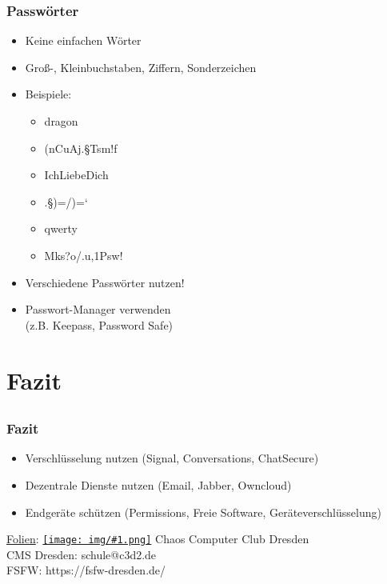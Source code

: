 \documentclass[12pt, xcolor={svgnames,table}]{beamer}
\newcommand{\cc}[1]{\texttt{[image: img/\#1.png]}\hspace{1mm}}
\begin{document}
\begin{frame}
    \frametitle{Passwörter}
    \begin{itemize}
        \item<2-> Keine einfachen Wörter
        \item<3-> Groß-, Kleinbuchstaben, Ziffern, Sonderzeichen
        \item<4-> Beispiele:
            \begin{itemize}
                \item<5-> dragon
                \item<6-> (nCuAj.§Tsm!f
                \item<7-> IchLiebeDich
                \item<8-> .§)=/)=`
                \item<9-> qwerty
                \item<10-> Mks?o/.u,1Psw!
            \end{itemize}
        \item<12-> Verschiedene Passwörter nutzen!
        \item<13-> Passwort-Manager verwenden \\ (z.B. Keepass, Password Safe)
    \end{itemize}
\end{frame}

\section{Fazit}
\subsection{}

\begin{frame}
  \frametitle{Fazit}
  \begin{center}
    \begin{itemize}
      \item Verschlüsselung nutzen (Signal, Conversations, ChatSecure)
      \item Dezentrale Dienste nutzen (Email, Jabber, Owncloud)
      \item Endgeräte schützen (Permissions, Freie Software, Geräteverschlüsselung)
    \end{itemize}

    \vspace{5mm}
    \href{https://github.com/c3d2/cms-nsa}{Folien}: \href{https://creativecommons.org/licenses/by-sa/4.0/}{\cc{by-sa}} Chaos Computer Club Dresden \\
    \vspace{3mm}
    CMS Dresden: schule@c3d2.de\\
    FSFW: https://fsfw-dresden.de/
  \end{center}
\end{frame}
\end{document}
